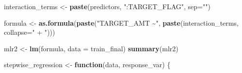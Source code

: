 \documentclass[
]{article}
\newenvironment{Shaded}{\begin{snugshade}}{\end{snugshade}}
\newcommand{\AttributeTok}[1]{\textcolor[rgb]{0.13,0.29,0.53}{#1}}
\newcommand{\ControlFlowTok}[1]{\textcolor[rgb]{0.13,0.29,0.53}{\textbf{#1}}}
\newcommand{\FunctionTok}[1]{\textcolor[rgb]{0.13,0.29,0.53}{\textbf{#1}}}
\newcommand{\NormalTok}[1]{#1}
\newcommand{\OtherTok}[1]{\textcolor[rgb]{0.56,0.35,0.01}{#1}}
\newcommand{\StringTok}[1]{\textcolor[rgb]{0.31,0.60,0.02}{#1}}
\begin{document}
\begin{Shaded}
\begin{Highlighting}[]
\NormalTok{interaction\_terms }\OtherTok{\textless{}{-}} \FunctionTok{paste}\NormalTok{(predictors, }\StringTok{":TARGET\_FLAG"}\NormalTok{, }\AttributeTok{sep=}\StringTok{""}\NormalTok{)}

\NormalTok{formula }\OtherTok{\textless{}{-}} \FunctionTok{as.formula}\NormalTok{(}\FunctionTok{paste}\NormalTok{(}\StringTok{"TARGET\_AMT \textasciitilde{}"}\NormalTok{, }\FunctionTok{paste}\NormalTok{(interaction\_terms, }\AttributeTok{collapse=}\StringTok{" + "}\NormalTok{)))}

\NormalTok{mlr2 }\OtherTok{\textless{}{-}} \FunctionTok{lm}\NormalTok{(formula, }\AttributeTok{data =}\NormalTok{ train\_final)}
\FunctionTok{summary}\NormalTok{(mlr2)}



\NormalTok{stepwise\_regression }\OtherTok{\textless{}{-}} \ControlFlowTok{function}\NormalTok{(data, response\_var) \{}
  

\end{Highlighting}
\end{Shaded}
\end{document}
